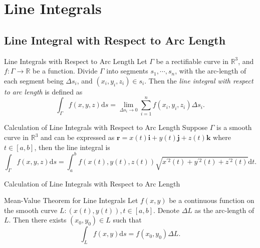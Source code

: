 
\section{Line Integrals}

\subsection{Line Integral with Respect to Arc Length}

\begin{definition}{Line Integrals with Respect to Arc Length}{}
  Let $\Gamma$ be a rectifiable curve in $\mathbb{R}^3$,
  and $f: \Gamma \rightarrow \mathbb{R}$ be a function.
  Divide $\Gamma$ into segments $s_1,\cdots,s_n$, with the arc-length of each
  segment being $\Delta s_i$, and $(x_i, y_i, z_i) \in s_i$.
  Then the \emph{line integral with respect to arc length} is defined as
  \begin{equation}
    \int_{\Gamma} f(x,y,z)\mathrm{d} s = \lim \limits _{\Delta s_i \rightarrow 0}
    \sum\limits_{i = 1}^n f(x_i, y_i, z_i) \Delta s_i.
  \end{equation}
\end{definition}

\begin{proposition}{Calculation of Line Integrals with Respect to Arc Length}{}
  Suppose $\Gamma$ is a smooth curve in $\mathbb{R}^3$ and can be expressed as
  $\mathbf{r} = x(t)\mathbf{i} + y(t)\mathbf{j} + z(t)\mathbf{k}$ where $t \in
  [a, b]$, then the line integral is
  \begin{equation}
    \int_{\Gamma} f(x,y,z) \mathrm{d} s = \int_a^b f(x(t), y(t), z(t))
    \sqrt{x^{\prime 2}(t) + y^{\prime 2}(t) + z^{\prime 2}(t)}\mathrm{d} t.
  \end{equation}
\end{proposition}

\begin{example}{Calculation of Line Integrals with Respect to Arc Length}{}
  
\end{example}


\begin{theorem}{Mean-Value Theorem for Line Integrals}{}
  Let $f(x, y)$ be a continuous function on the smooth curve
  $L: (x(t), y(t)), t \in [a, b]$.
  Denote $\Delta L$ as the arc-length of $L$.
  Then there exists $(x_0, y_0) \in L$ such that
  \begin{equation}
    \int_L f(x, y)\mathrm{d} s = f(x_0, y_0)\Delta L.
  \end{equation}
\end{theorem}

